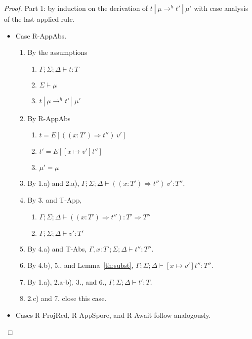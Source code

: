 \begin{proof}

Part 1: by induction on the derivation of $t~|~\mu \rightarrow^h t'~|~\mu'$ with case analysis of the last applied rule.

\begin{itemize}
\item Case R-AppAbs.
\begin{enumerate}
\item By the assumptions
  \begin{enumerate}[label=(\alph*)]
  \item $\Gamma ; \Sigma ; \Delta \vdash t : T$
  \item $\Sigma \vdash \mu$
  \item $t~|~\mu \rightarrow^h t'~|~\mu'$
  \end{enumerate}
\item By R-AppAbs
  \begin{enumerate}[label=(\alph*)]
  \item $t = E[((x : T') \Rightarrow t'')~v']$
  \item $t' = E[[x \mapsto v']t'']$
  \item $\mu' = \mu$
  \end{enumerate}
\item By 1.a) and 2.a), $\Gamma ; \Sigma ; \Delta \vdash ((x : T') \Rightarrow t'')~v' : T''$.
\item By 3. and T-App,
  \begin{enumerate}[label=(\alph*)]
  \item $\Gamma ; \Sigma ; \Delta \vdash ((x : T') \Rightarrow t'') : T' \Rightarrow T''$
  \item $\Gamma ; \Sigma ; \Delta \vdash v' : T'$
  \end{enumerate}
\item By 4.a) and T-Abs, $\Gamma , x : T' ; \Sigma ; \Delta \vdash t'' : T''$.
\item By 4.b), 5., and Lemma~\ref{th:subst}, $\Gamma ; \Sigma ; \Delta \vdash [x \mapsto v']t'' : T''$.
\item By 1.a), 2.a-b), 3., and 6., $\Gamma ; \Sigma ; \Delta \vdash t' : T$.
\item 2.c) and 7. close this case.
\end{enumerate}

\item Cases R-ProjRcd, R-AppSpore, and R-Await follow analogously.


\end{itemize}
\end{proof}
